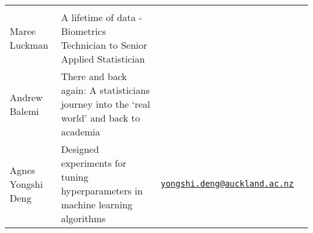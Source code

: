 \documentclass[
]{book}
\begin{document}
\begin{longtable}[]{@{}llll@{}}
\begin{minipage}[t]{0.22\columnwidth}
\strut
\end{minipage} & \begin{minipage}[t]{0.22\columnwidth}\raggedright
\strut
\end{minipage} & \begin{minipage}[t]{0.22\columnwidth}\raggedright
\strut
\end{minipage}\tabularnewline
\begin{minipage}[t]{0.22\columnwidth}\raggedright
Maree Luckman\strut
\end{minipage} & \begin{minipage}[t]{0.22\columnwidth}\raggedright
A lifetime of data - Biometrics Technician to Senior Applied Statistician\strut
\end{minipage} & \begin{minipage}[t]{0.22\columnwidth}\raggedright
\strut
\end{minipage} & \begin{minipage}[t]{0.22\columnwidth}\raggedright
\strut
\end{minipage}\tabularnewline
\begin{minipage}[t]{0.22\columnwidth}\raggedright
Andrew Balemi\strut
\end{minipage} & \begin{minipage}[t]{0.22\columnwidth}\raggedright
There and back again: A statisticians journey into the `real world' and back to academia\strut
\end{minipage} & \begin{minipage}[t]{0.22\columnwidth}\raggedright
\strut
\end{minipage} & \begin{minipage}[t]{0.22\columnwidth}\raggedright
\strut
\end{minipage}\tabularnewline
\begin{minipage}[t]{0.22\columnwidth}\raggedright
Agnes Yongshi Deng\strut
\end{minipage} & \begin{minipage}[t]{0.22\columnwidth}\raggedright
Designed experiments for tuning hyperparameters in machine learning algorithms\strut
\end{minipage} & \begin{minipage}[t]{0.22\columnwidth}\raggedright
\href{mailto:yongshi.deng@auckland.ac.nz}{\nolinkurl{yongshi.deng@auckland.ac.nz}}\strut
\end{minipage} & \begin{minipage}[t]{0.22\columnwidth}\raggedright
\strut
\end{minipage}\tabularnewline

\end{longtable}
\end{document}
